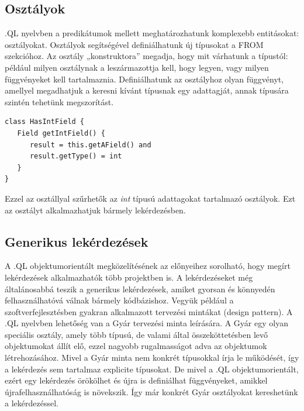 \documentclass[a4paper,12pt]{report}
\begin{document}
\subsection{Osztályok}
.QL nyelvben a predikátumok mellett meghatározhatunk komplexebb entitásokat: osztályokat. Osztályok segítségével definiálhatunk új típusokat a FROM szekcióhoz. Az osztály „konstruktora” megadja, hogy mit várhatunk a típustól: például milyen osztálynak a leszármazottja kell, hogy legyen, vagy milyen függvényeket kell tartalmaznia. Definiálhatunk az osztályhoz olyan függvényt, amellyel megadhatjuk a keresni kívánt típusnak egy adattagját, annak típusára szintén tehetünk megszorítást.
\begin{verbatim}
class HasIntField {
   Field getIntField() {
      result = this.getAField() and
      result.getType() = int
   }
}
\end{verbatim}
Ezzel az osztállyal szűrhetők az \textit{int} típusú adattagokat tartalmazó osztályok. Ezt az osztályt alkalmazhatjuk bármely lekérdezésben.
\subsection{Generikus lekérdezések}
\par A .QL objektumorientált megközelítésének az előnyeihez sorolható, hogy megírt lekérdezések alkalmazhatók több projektben is. A lekérdezéseket még általánosabbá teszik a generikus lekérdezések, amiket gyorsan és könnyedén felhasználhatóvá válnak bármely kódbázishoz. Vegyük például a szoftverfejlesztésben gyakran alkalmazott tervezési mintákat (design pattern). A .QL nyelvben lehetőség van a Gyár tervezési minta leírására. A Gyár egy olyan speciális osztály, amely több típusú, de valami által összeköttetésben levő objektumokat állít elő, ezzel nagyobb rugalmasságot adva az objektumok létrehozásához. Mivel a Gyár minta nem konkrét típusokkal írja le működését, így a lekérdezés sem tartalmaz explicite típusokat. De mivel a .QL objektumorientált, ezért egy lekérdezés örökölhet és újra is definiálhat függvényeket, amikkel újrafelhasználhatóság is növekszik. Így már konkrét Gyár osztályokat kereshetünk a lekérdezéssel.
\end{document}
